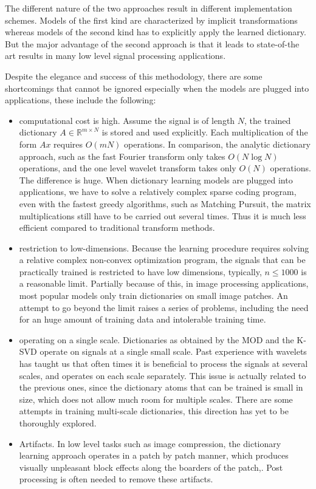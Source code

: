 \documentclass[a4paper]{article}
\begin{document}
The different nature of the two approaches result in different implementation schemes. Models of the first kind are characterized by implicit transformations whereas models of the second kind has to explicitly apply the learned dictionary. But the major advantage of the second approach is that it leads to state-of-the art results in many low level signal processing applications. 

Despite the elegance and success of this methodology, there are some shortcomings that cannot be ignored especially when the models are plugged into applications, these include the following:
\begin{itemize}
\item computational cost is high. Assume the signal is of length $N$, the trained dictionary $A\in \mathbb{R}^{m\times N}$ is stored and used explicitly. Each multiplication of the form $Ax$ requires $O(mN)$ operations. In comparison, the analytic dictionary approach, such as the fast Fourier transform only takes $O(N\log N)$ operations, and the one level wavelet transform takes only $O(N)$ operations. The difference is huge. When dictionary learning models are plugged into applications, we have to solve a relatively complex sparse coding program, even with the fastest greedy algorithms, such as Matching Pursuit, the matrix multiplications still have to be carried out several times. Thus it is much less efficient compared to traditional transform methods.
\item restriction to low-dimensions. Because the learning procedure requires solving a relative complex non-convex optimization program, the signals that can be practically trained is restricted to have low dimensions, typically, $n\leq 1000$ is a reasonable limit. Partially because of this, in image processing applications, most popular models only train dictionaries on small image patches. An attempt to go beyond the limit raises a series of problems, including the need for an huge amount of training data and intolerable training time.
\item operating on a single scale. Dictionaries as obtained by the MOD and the K-SVD operate on signals at a single small scale. Past experience with wavelets has taught us that often times it is beneficial to process the signals at several scales, and operates on each scale separately. This issue is actually related to the previous ones, since the dictionary atoms that can be trained is small in size, which does not allow much room for multiple scales. There are some attempts in training multi-scale dictionaries, this direction has yet to be thoroughly explored.
\item Artifacts.  In low level tasks such as image compression, the dictionary learning approach operates in a patch by patch manner, which produces visually unpleasant block effects along the boarders of the patch,\cite{bryt2008compression}.  Post processing is often needed to remove these artifacts\cite{bryt2008improving}. 
\end{itemize}
\end{document}
